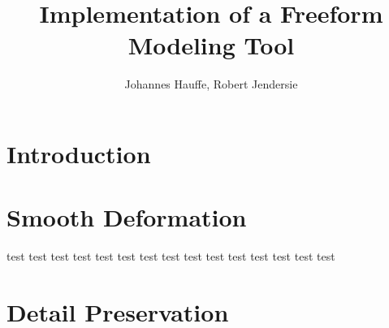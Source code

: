 \documentclass[twocolumn]{article}
\begin{document}
\title{Implementation of a Freeform Modeling Tool }


\author{Johannes Hauffe, Robert Jendersie}

\maketitle

\section{Introduction}
\cite{botsch2004intuitive}

\section{Smooth Deformation}
test test test test test test test test test test test test test test test
\section{Detail Preservation}




\end{document}

